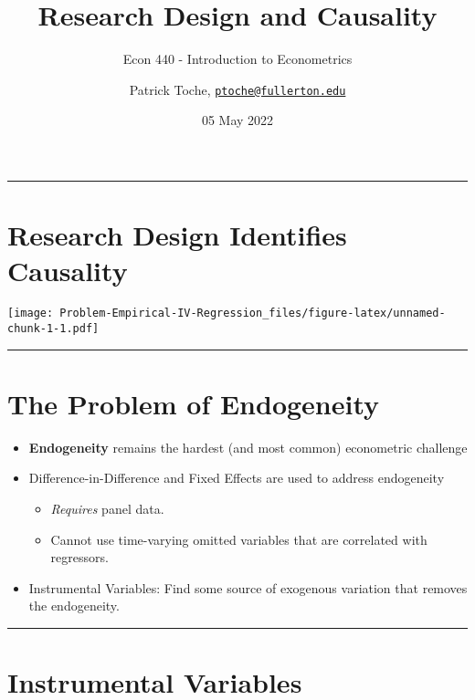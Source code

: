 \documentclass[
]{article}
\title{Research Design and Causality}
\subtitle{Econ 440 - Introduction to Econometrics}
\author{Patrick Toche,
\href{mailto:ptoche@fullerton.edu}{\nolinkurl{ptoche@fullerton.edu}}}
\date{05 May 2022}
\providecommand{\tightlist}{%
  \setlength{\itemsep}{0pt}\setlength{\parskip}{0pt}}
\begin{document}
\maketitle

\begin{center}\rule{0.5\linewidth}{0.5pt}\end{center}

\hypertarget{research-design-identifies-causality}{%
\section{Research Design Identifies
Causality}\label{research-design-identifies-causality}}

\texttt{[image: Problem-Empirical-IV-Regression\_files/figure-latex/unnamed-chunk-1-1.pdf]}

\begin{center}\rule{0.5\linewidth}{0.5pt}\end{center}

\hypertarget{the-problem-of-endogeneity}{%
\section{The Problem of Endogeneity}\label{the-problem-of-endogeneity}}

\begin{itemize}
\item
  \textbf{Endogeneity} remains the hardest (and most common) econometric
  challenge
\item
  Difference-in-Difference and Fixed Effects are used to address
  endogeneity

  \begin{itemize}
  \tightlist
  \item
    \emph{Requires} panel data.
  \item
    Cannot use time-varying omitted variables that are correlated with
    regressors.
  \end{itemize}
\item
  Instrumental Variables: Find some source of exogenous variation that
  removes the endogeneity.
\end{itemize}

\begin{center}\rule{0.5\linewidth}{0.5pt}\end{center}

\hypertarget{instrumental-variables}{%
\section{Instrumental Variables}\label{instrumental-variables}}
\end{document}
